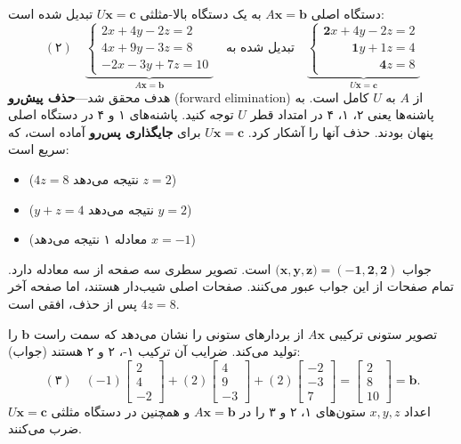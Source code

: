 \documentclass[12pt, a4paper]{book}
\theoremstyle{translator}
\begin{document}
	دستگاه اصلی $A\mathbf{x} = \mathbf{b}$ به یک دستگاه بالا-مثلثی $U\mathbf{x} = \mathbf{c}$ تبدیل شده است:
	\[
	(۲) \quad
	\underbrace{
		\begin{cases}
			2x + 4y - 2z = 2 \\
			4x + 9y - 3z = 8 \\
			-2x - 3y + 7z = 10
		\end{cases}
	}_{A\mathbf{x}=\mathbf{b}}
	\quad \text{تبدیل شده به} \quad
	\underbrace{
		\begin{cases}
			\mathbf{2}x + 4y - 2z = 2 \\
			\phantom{2x+} \mathbf{1}y + 1z = 4 \\
			\phantom{2x+4y-} \mathbf{4}z = 8
		\end{cases}
	}_{U\mathbf{x}=\mathbf{c}}
	\]
	هدف محقق شد—\textbf{حذف پیش‌رو} (forward elimination) از $A$ به $U$ کامل است. به پاشنه‌ها یعنی ۲، ۱، ۴ در امتداد قطر $U$ توجه کنید. پاشنه‌های ۱ و ۴ در دستگاه اصلی پنهان بودند. حذف آنها را آشکار کرد. $U\mathbf{x} = \mathbf{c}$ برای \textbf{جایگذاری پس‌رو} آماده است، که سریع است:
	\begin{itemize}
		\item ($4z=8$ نتیجه می‌دهد $z=2$)
		\item ($y+z=4$ نتیجه می‌دهد $y=2$)
		\item (معادله ۱ نتیجه می‌دهد $x=-1$)
	\end{itemize}
	جواب $(\mathbf{x, y, z) = (-1, 2, 2)}$ است. تصویر سطری سه صفحه از سه معادله دارد. تمام صفحات از این جواب عبور می‌کنند. صفحات اصلی شیب‌دار هستند، اما صفحه آخر $4z=8$ پس از حذف، افقی است.
	
	تصویر ستونی ترکیبی $A\mathbf{x}$ از بردارهای ستونی را نشان می‌دهد که سمت راست $\mathbf{b}$ را تولید می‌کند. ضرایب آن ترکیب ۱-، ۲ و ۲ هستند (جواب):
	\[
	(۳) \quad
	(-1) \begin{bmatrix} 2 \\ 4 \\ -2 \end{bmatrix}
	+ (2) \begin{bmatrix} 4 \\ 9 \\ -3 \end{bmatrix}
	+ (2) \begin{bmatrix} -2 \\ -3 \\ 7 \end{bmatrix}
	=
	\begin{bmatrix} 2 \\ 8 \\ 10 \end{bmatrix}
	= \mathbf{b}.
	\]
	اعداد $x, y, z$ ستون‌های ۱، ۲ و ۳ را در $A\mathbf{x}=\mathbf{b}$ و همچنین در دستگاه مثلثی $U\mathbf{x} = \mathbf{c}$ ضرب می‌کنند.
	
\end{document}
